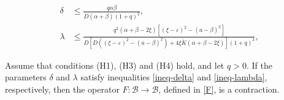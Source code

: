 \documentclass[10pt,a4paper]{amsart}
\begin{document}
\begin{align}
\delta &\leq \frac{q\alpha\beta}{D(\alpha+\beta)(1+q)^2}, \label{ineq-delta} \\
\lambda &\leq \frac{q^2(\alpha+\beta - 2\xi)\left[(\xi - \varepsilon)^2 - (a - \beta)^2\right]}{D\left[D\left((\xi - \varepsilon)^2 - (a - \beta)^2\right) + 4\xi\tilde{K}(\alpha + \beta - 2\xi)\right](1 + q)^3}, \label{ineq-lambda}
\end{align}

    \begin{lemma}\label{lemma:contraction}
Assume that conditions \textnormal{(H1)}, \textnormal{(H3)} and \textnormal{(H4)} hold, and let \(q > 0\). If the parameters \(\delta\) and \(\lambda\) satisfy inequalities \eqref{ineq-delta} and \eqref{ineq-lambda}, respectively, then the operator \(F \colon \mathcal{B} \to \mathcal{B}\), defined in \eqref{F}, is a contraction.
\end{lemma}
\end{document}
